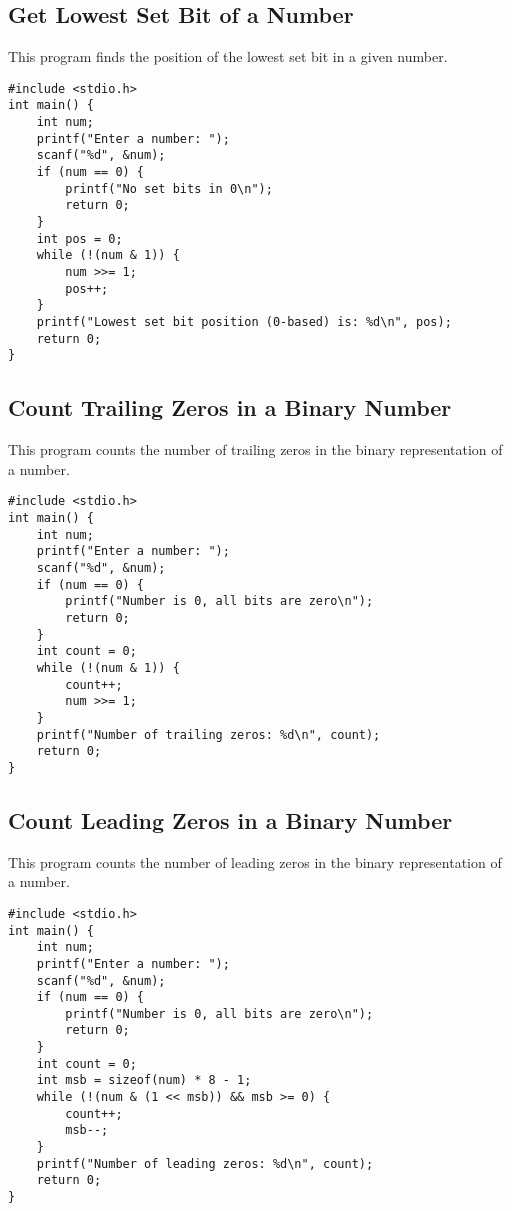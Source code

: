\documentclass[a4paper,12pt]{article}
\begin{document}
\newpage

\subsection{Get Lowest Set Bit of a Number}
This program finds the position of the lowest set bit in a given number.

\begin{lstlisting}[caption={Get Lowest Set Bit of a Number}]
#include <stdio.h>
int main() {
    int num;
    printf("Enter a number: ");
    scanf("%d", &num);
    if (num == 0) {
        printf("No set bits in 0\n");
        return 0;
    }
    int pos = 0;
    while (!(num & 1)) {
        num >>= 1;
        pos++;
    }
    printf("Lowest set bit position (0-based) is: %d\n", pos);
    return 0;
}
\end{lstlisting}

\newpage

\subsection{Count Trailing Zeros in a Binary Number}
This program counts the number of trailing zeros in the binary representation of a number.

\begin{lstlisting}[caption={Count Trailing Zeros in a Binary Number}]
#include <stdio.h>
int main() {
    int num;
    printf("Enter a number: ");
    scanf("%d", &num);
    if (num == 0) {
        printf("Number is 0, all bits are zero\n");
        return 0;
    }
    int count = 0;
    while (!(num & 1)) {
        count++;
        num >>= 1;
    }
    printf("Number of trailing zeros: %d\n", count);
    return 0;
}
\end{lstlisting}

\newpage

\subsection{Count Leading Zeros in a Binary Number}
This program counts the number of leading zeros in the binary representation of a number.

\begin{lstlisting}[caption={Count Leading Zeros in a Binary Number}]
#include <stdio.h>
int main() {
    int num;
    printf("Enter a number: ");
    scanf("%d", &num);
    if (num == 0) {
        printf("Number is 0, all bits are zero\n");
        return 0;
    }
    int count = 0;
    int msb = sizeof(num) * 8 - 1;
    while (!(num & (1 << msb)) && msb >= 0) {
        count++;
        msb--;
    }
    printf("Number of leading zeros: %d\n", count);
    return 0;
}
\end{lstlisting}
\end{document}
